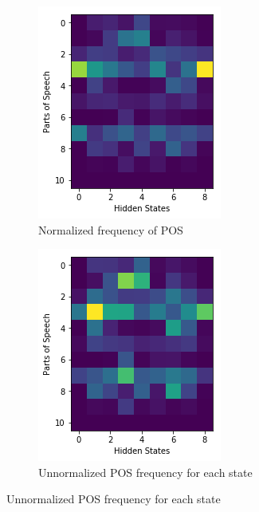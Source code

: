 \begin{figure}[H]
	\begin{subfigure}[t]{0.2\textwidth}
		\includegraphics[width=\textwidth]{9states_normalized.png}
		\caption{Normalized frequency of POS}
	\end{subfigure}%
	\begin{subfigure}[t]{0.2\textwidth}
		\includegraphics[width=\textwidth]{9state_unnormalized.png}
		\caption{Unnormalized POS frequency for each state}
	\end{subfigure}%
	

\end{figure}
